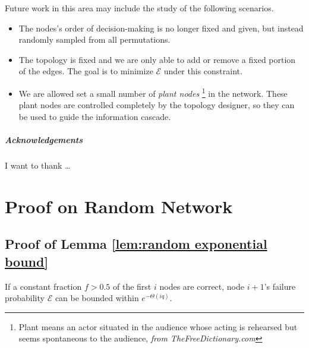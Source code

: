 \documentclass[a4paper,UKenglish]{lipics}
\theoremstyle{definition}
\begin{document}
Future work in this area may include the study of the following scenarios.
\begin{itemize}
\item The nodes's order of decision-making is no longer fixed and given, but instead randomly sampled from all permutations.
\item The topology is fixed and we are only able to add or remove a fixed portion of the edges.
		The goal is to minimize $\mathcal{E}$ under this constraint.
\item We are allowed set a small number of \emph{plant nodes}
	\footnote{Plant means an actor situated in the audience whose acting is rehearsed but seems spontaneous to the audience, 
	\emph{from TheFreeDictionary.com}} in the network.
	These plant nodes are controlled completely by the topology designer, so they can be used to guide the information cascade.
\end{itemize}









\subparagraph*{Acknowledgements}

I want to thank \dots









\clearpage
\appendix
\section{Proof on Random Network}

\subsection{Proof of Lemma \ref{lem:random exponential bound}}
\label{subsec:random exponential bound}

If a constant fraction $f > 0.5$ of the first $i$ nodes are correct, 
	node $i+1$'s failure probability $\mathcal{E}$ can be bounded within $e^{-\Theta(iq)}$. 
\end{document}
